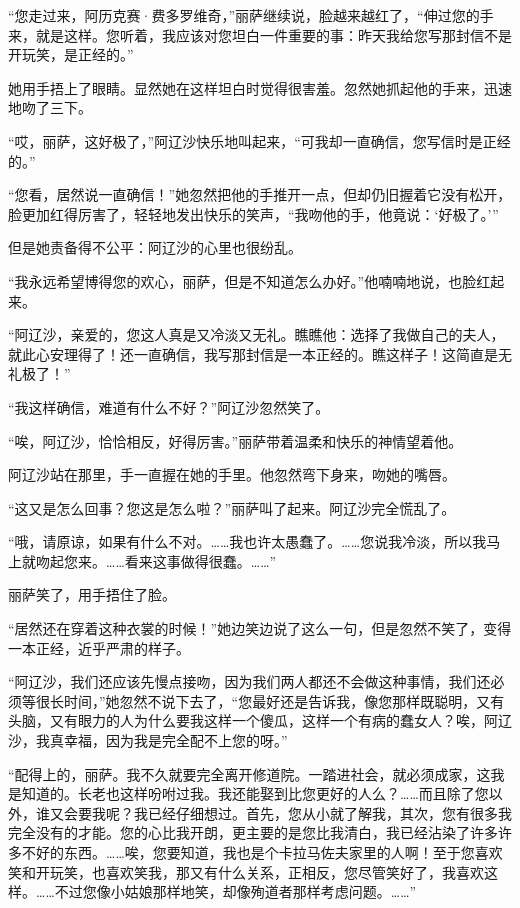 \par “您走过来，阿历克赛·费多罗维奇，”丽萨继续说，脸越来越红了，“伸过您的手来，就是这样。您听着，我应该对您坦白一件重要的事：昨天我给您写那封信不是开玩笑，是正经的。”
\par 她用手捂上了眼睛。显然她在这样坦白时觉得很害羞。忽然她抓起他的手来，迅速地吻了三下。
\par “哎，丽萨，这好极了，”阿辽沙快乐地叫起来，“可我却一直确信，您写信时是正经的。”
\par “您看，居然说一直确信！”她忽然把他的手推开一点，但却仍旧握着它没有松开，脸更加红得厉害了，轻轻地发出快乐的笑声，“我吻他的手，他竟说：‘好极了。’”
\par 但是她责备得不公平：阿辽沙的心里也很纷乱。
\par “我永远希望博得您的欢心，丽萨，但是不知道怎么办好。”他喃喃地说，也脸红起来。
\par “阿辽沙，亲爱的，您这人真是又冷淡又无礼。瞧瞧他：选择了我做自己的夫人，就此心安理得了！还一直确信，我写那封信是一本正经的。瞧这样子！这简直是无礼极了！”
\par “我这样确信，难道有什么不好？”阿辽沙忽然笑了。
\par “唉，阿辽沙，恰恰相反，好得厉害。”丽萨带着温柔和快乐的神情望着他。
\par 阿辽沙站在那里，手一直握在她的手里。他忽然弯下身来，吻她的嘴唇。
\par “这又是怎么回事？您这是怎么啦？”丽萨叫了起来。阿辽沙完全慌乱了。
\par “哦，请原谅，如果有什么不对。……我也许太愚蠢了。……您说我冷淡，所以我马上就吻起您来。……看来这事做得很蠢。……”
\par 丽萨笑了，用手捂住了脸。
\par “居然还在穿着这种衣裳的时候！”她边笑边说了这么一句，但是忽然不笑了，变得一本正经，近乎严肃的样子。
\par “阿辽沙，我们还应该先慢点接吻，因为我们两人都还不会做这种事情，我们还必须等很长时间，”她忽然不说下去了，“您最好还是告诉我，像您那样既聪明，又有头脑，又有眼力的人为什么要我这样一个傻瓜，这样一个有病的蠢女人？唉，阿辽沙，我真幸福，因为我是完全配不上您的呀。”
\par “配得上的，丽萨。我不久就要完全离开修道院。一踏进社会，就必须成家，这我是知道的。长老也这样吩咐过我。我还能娶到比您更好的人么？……而且除了您以外，谁又会要我呢？我已经仔细想过。首先，您从小就了解我，其次，您有很多我完全没有的才能。您的心比我开朗，更主要的是您比我清白，我已经沾染了许多许多不好的东西。……唉，您要知道，我也是个卡拉马佐夫家里的人啊！至于您喜欢笑和开玩笑，也喜欢笑我，那又有什么关系，正相反，您尽管笑好了，我喜欢这样。……不过您像小姑娘那样地笑，却像殉道者那样考虑问题。……”
